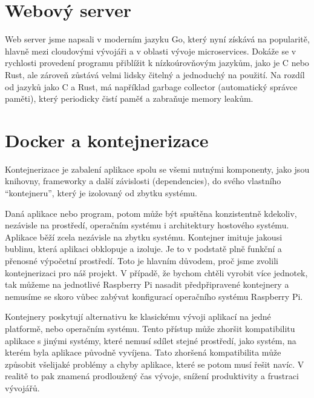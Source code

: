 \documentclass[czech,12pt,a4paper]{article}
\begin{document}
\section{Webový server}

Web server jsme napsali v moderním jazyku Go, který nyní získává na popularitě, hlavně mezi cloudovými vývojáři a v oblasti vývoje microservices. Dokáže se v rychlosti provedení programu přiblížit k nízkoúrovňovým jazykům, jako je C nebo Rust, ale zároveň zůstává velmi lidsky čitelný a jednoduchý na použití. Na rozdíl od jazyků jako C a Rust, má například garbage collector (automatický správce paměti), který periodicky čistí paměť a zabraňuje memory leakům.

\section{Docker a kontejnerizace}


Kontejnerizace je zabalení aplikace spolu se všemi nutnými komponenty, jako jsou knihovny, frameworky a další závislosti (dependencies), do svého vlastního \enquote{kontejneru}, který je izolovaný od zbytku systému.

Daná aplikace nebo program, potom může být spuštěna konzistentně kdekoliv, nezávisle na prostředí, operačním systému i architektury hostového systému. Aplikace běží zcela nezávisle na zbytku systému. Kontejner imituje jakousi bublinu, která aplikaci obklopuje a izoluje. Je to v podstatě plně funkční a přenosné výpočetní prostředí. Toto je hlavním důvodem, proč jsme zvolili kontejnerizaci pro náš projekt. V případě, že bychom chtěli vyrobit více jednotek, tak můžeme na jednotlivé Raspberry Pi nasadit předpřipravené kontejnery a nemusíme se skoro vůbec zabývat konfigurací operačního systému Raspberry Pi.

Kontejnery poskytují alternativu ke klasickému vývoji aplikací na jedné platformě, nebo operačním systému. Tento přístup může zhoršit kompatibilitu aplikace s jinými systémy, které nemusí sdílet stejné prostředí, jako systém, na kterém byla aplikace původně vyvíjena. Tato zhoršená kompatibilita může způsobit všelijaké problémy a chyby aplikace, které se potom musí řešit navíc. V realitě to pak znamená prodloužený čas vývoje, snížení produktivity a frustraci vývojářů.
\end{document}
